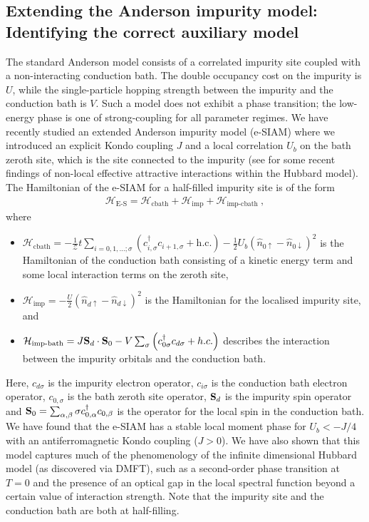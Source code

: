 \documentclass[reprint,hidelinks,onecolumn]{revtex4-2}
\begin{document}
\subsection{Extending the Anderson impurity model: Identifying the correct auxiliary model}
The standard Anderson model consists of a correlated impurity site coupled with a non-interacting conduction bath. The double occupancy cost on the impurity is \(U\), while the single-particle hopping strength between the impurity and the conduction bath is \(V\). Such a model does not exhibit a phase transition; the low-energy phase is one of strong-coupling for all parameter regimes. We have recently studied an extended Anderson impurity model (e-SIAM) where we introduced an explicit Kondo coupling \(J\) and a local correlation \(U_b\) on the bath zeroth site, which is the site connected to the impurity (see \cite{gazizovaleblanc2023} for some recent findings of non-local effective attractive interactions within the Hubbard model). The Hamiltonian of the e-SIAM for a half-filled impurity site is of the form
\begin{equation}\begin{aligned}
	\label{siam_attr}
	\mathcal{H}_\text{E-S} = \mathcal{H}_\text{cbath} + \mathcal{H}_\text{imp} + \mathcal{H}_\text{imp-cbath}~,
\end{aligned}\end{equation}
where 
\begin{itemize}
	\item \(\mathcal{H}_\text{cbath} = -\frac{1}{\mathcal{Z}}t\sum_{i=0,1,\ldots;\sigma}\left(c^\dagger_{i,\sigma}c_{i+1,\sigma} + \text{h.c.}\right) - \frac{1}{2}U_b\left(\hat n_{0 \uparrow} - \hat n_{0 \downarrow}\right)^2\) is the Hamiltonian of the conduction bath consisting of a kinetic energy term and some local interaction terms on the zeroth site,
	\item \(\mathcal{H}_\text{imp} = - \frac{U}{2}\left(\hat n_{d \uparrow} - \hat n_{d \downarrow} \right) ^2\) is the Hamiltonian for the localised impurity site, and
	\item \(\mathcal{H}_\text{imp-bath} = J {\bf S}_d\cdot{\bf S}_0 - V \sum_{\sigma} \left(c^\dagger_{0\sigma} c_{d\sigma} + h.c.\right)\) describes the interaction between the impurity orbitals and the conduction bath.
\end{itemize}
Here, \(c_{d\sigma}\) is the impurity electron operator, \(c_{i\sigma}\) is the conduction bath electron operator, \(c_{0,\sigma}\) is the bath zeroth site operator, \({\bf S}_d\) is the impurity spin operator and \({\bf S}_0 = \sum_{\alpha,\beta}{\bf \sigma}c^\dagger_{0,\alpha}c_{0,\beta}\) is the operator for the local spin in the conduction bath. We have found that the e-SIAM has a stable local moment phase for \(U_b < -J/4\) with an antiferromagnetic Kondo coupling (\(J > 0\)). We have also shown that this model captures much of the phenomenology of the infinite dimensional Hubbard model (as discovered via DMFT), such as a second-order phase transition at \(T=0\) and the presence of an optical gap in the local spectral function beyond a certain value of interaction strength. Note that the impurity site and the conduction bath are both at half-filling.
\end{document}
